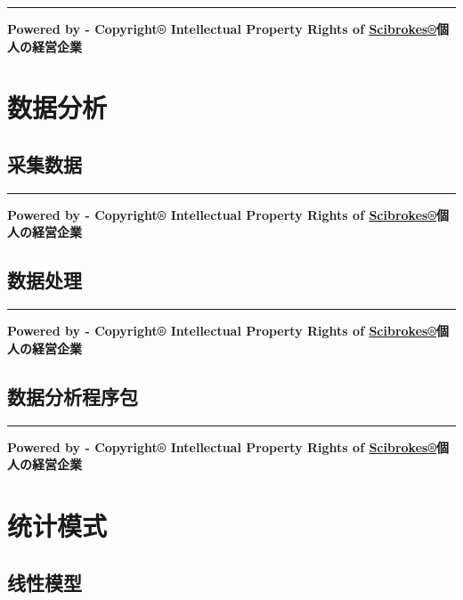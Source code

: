\documentclass[]{book}
\theoremstyle{definition}
\theoremstyle{definition}
\theoremstyle{definition}
\theoremstyle{remark}
\begin{document}
\begin{center}\rule{0.5\linewidth}{\linethickness}\end{center}

\textbf{Powered by - Copyright® Intellectual Property Rights of
\href{http://www.scibrokes.com}{Scibrokes®}個人の経営企業}

\hypertarget{analytics}{%
\chapter{数据分析}\label{analytics}}

\section{采集数据}

\begin{center}\rule{0.5\linewidth}{\linethickness}\end{center}

\textbf{Powered by - Copyright® Intellectual Property Rights of
\href{http://www.scibrokes.com}{Scibrokes®}個人の経営企業}

\section{数据处理}

\begin{center}\rule{0.5\linewidth}{\linethickness}\end{center}

\textbf{Powered by - Copyright® Intellectual Property Rights of
\href{http://www.scibrokes.com}{Scibrokes®}個人の経営企業}

\section{数据分析程序包}

\begin{center}\rule{0.5\linewidth}{\linethickness}\end{center}

\textbf{Powered by - Copyright® Intellectual Property Rights of
\href{http://www.scibrokes.com}{Scibrokes®}個人の経営企業}

\hypertarget{stats}{%
\chapter{统计模式}\label{stats}}

\section{线性模型}
\end{document}
